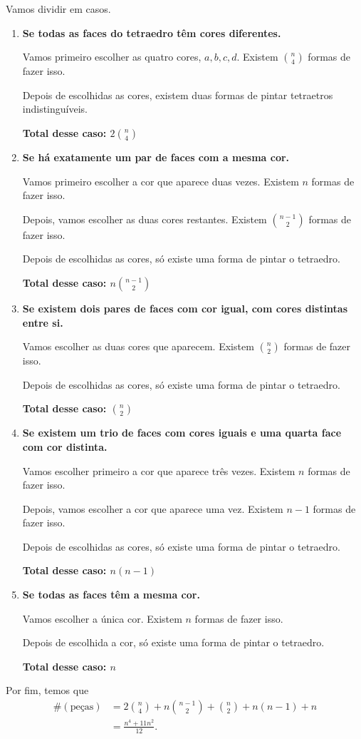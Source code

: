 Vamos dividir em casos.
\begin{enumerate}[label = \bfseries \Alph*.]
	\item \textbf{Se todas as faces do tetraedro têm cores diferentes.}

		Vamos primeiro escolher as quatro cores, ${a, b, c, d}$. Existem $\binom{n}{4}$ formas de fazer isso.

		Depois de escolhidas as cores, existem duas formas de pintar tetraetros indistinguíveis.

		\hfill \textbf{Total desse caso: $2\binom{n}{4}$}

	\item \textbf{Se há exatamente um par de faces com a mesma cor.}

		Vamos primeiro escolher a cor que aparece duas vezes. Existem $n$ formas de fazer isso.

		Depois, vamos escolher as duas cores restantes. Existem $\binom{n-1}{2}$ formas de fazer isso.

		Depois de escolhidas as cores, só existe uma forma de pintar o tetraedro.

		\hfill \textbf{Total desse caso: $n\binom{n-1}{2}$}

	\item \textbf{Se existem dois pares de faces com cor igual, com cores distintas entre si.}

		Vamos escolher as duas cores que aparecem. Existem $\binom{n}{2}$ formas de fazer isso.

		Depois de escolhidas as cores, só existe uma forma de pintar o tetraedro.

		\hfill \textbf{Total desse caso: $\binom{n}{2}$}

	\item \textbf{Se existem um trio de faces com cores iguais e uma quarta face com cor distinta.}

		Vamos escolher primeiro a cor que aparece três vezes. Existem $n$ formas de fazer isso.
		
		Depois, vamos escolher a cor que aparece uma vez. Existem $n-1$ formas de fazer isso.

		Depois de escolhidas as cores, só existe uma forma de pintar o tetraedro.

		\hfill \textbf{Total desse caso: $n(n-1)$}

	\item \textbf{Se todas as faces têm a mesma cor.}

		Vamos escolher a única cor. Existem $n$ formas de fazer isso.

		Depois de escolhida a cor, só existe uma forma de pintar o tetraedro.
		
		\hfill \textbf{Total desse caso: $n$}
\end{enumerate}

Por fim, temos que
\begin{align*}
	\#(\text{peças}) &= 2\binom{n}{4} + n\binom{n-1}{2} + \binom{n}{2} + n(n-1) + n\\
					 &= \frac{n^4 + 11n^2}{12}. 
\end{align*}
